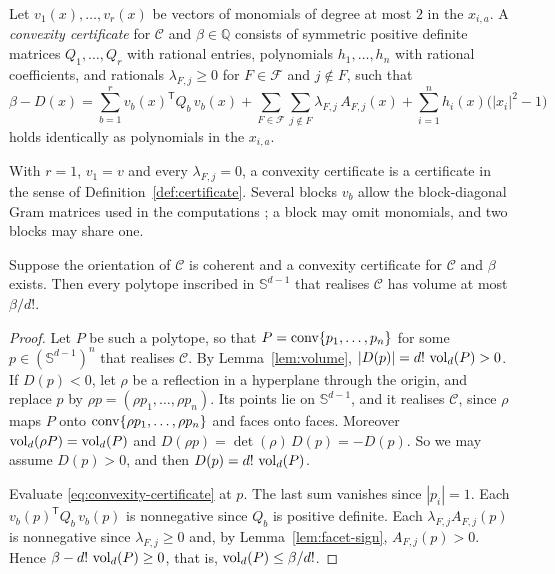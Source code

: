 \begin{definition}
  \label{def:convexity-certificate}
  Let $v_{1}(x), \ldots, v_{r}(x)$ be vectors of monomials of degree at most
  $2$ in the $x_{i,a}$. A \emph{convexity certificate} for $\mathcal{C}$ and
  $\beta \in \mathbb{Q}$ consists of symmetric positive definite matrices
  $Q_{1}, \ldots, Q_{r}$ with rational entries, polynomials
  $h_{1}, \ldots, h_{n}$ with rational coefficients, and rationals
  $\lambda_{F,j} \geq 0$ for $F \in \mathcal{F}$ and $j \notin F$, such that
  \begin{equation}
    \label{eq:convexity-certificate}
    \beta - D(x)
    = \sum_{b=1}^{r} v_{b}(x)^{\mathsf{T}} Q_{b}\, v_{b}(x)
      + \sum_{F \in \mathcal{F}} \sum_{j \notin F} \lambda_{F,j}\, A_{F,j}(x)
      + \sum_{i=1}^{n} h_{i}(x)\bigl(|x_{i}|^{2} - 1\bigr)
  \end{equation}
  holds identically as polynomials in the $x_{i,a}$.
\end{definition}

With $r = 1$, $v_{1} = v$ and every $\lambda_{F,j} = 0$, a convexity
certificate is a certificate in the sense of Definition~\ref{def:certificate}.
Several blocks $v_{b}$ allow the block-diagonal Gram matrices used in the
computations \cite[Section~3.4]{medgyes-maxvol-d4}; a block may omit
monomials, and two blocks may share one.

\begin{proposition}
  \label{prop:convexity-certificate}
  Suppose the orientation of $\mathcal{C}$ is coherent and a convexity
  certificate for $\mathcal{C}$ and $\beta$ exists. Then every polytope
  inscribed in $\mathbb{S}^{d-1}$ that realises $\mathcal{C}$ has volume at
  most $\beta/d!$.
\end{proposition}

\begin{proof}
  Let $P$ be such a polytope, so that $P = \operatorname{conv}\{p_{1}, \ldots, p_{n}\}$
  for some $p \in (\mathbb{S}^{d-1})^{n}$ that realises $\mathcal{C}$. By
  Lemma~\ref{lem:volume}, $|D(p)| = d!\,\operatorname{vol}_{d}(P) > 0$. If $D(p) < 0$,
  let $\rho$ be a reflection in a hyperplane through the origin, and
  replace $p$ by $\rho p = (\rho p_{1}, \ldots, \rho p_{n})$. Its points
  lie on $\mathbb{S}^{d-1}$, and it realises $\mathcal{C}$, since $\rho$
  maps $P$ onto $\operatorname{conv}\{\rho p_{1}, \ldots, \rho p_{n}\}$ and faces onto
  faces. Moreover $\operatorname{vol}_{d}(\rho P) = \operatorname{vol}_{d}(P)$ and
  $D(\rho p) = \det(\rho)\,D(p) = -D(p)$. So we may assume $D(p) > 0$,
  and then $D(p) = d!\,\operatorname{vol}_{d}(P)$.

  Evaluate \eqref{eq:convexity-certificate} at $p$. The last sum vanishes
  since $|p_{i}| = 1$. Each $v_{b}(p)^{\mathsf{T}} Q_{b}\, v_{b}(p)$ is
  nonnegative since $Q_{b}$ is positive definite. Each
  $\lambda_{F,j} A_{F,j}(p)$ is nonnegative since $\lambda_{F,j} \geq 0$ and,
  by Lemma~\ref{lem:facet-sign}, $A_{F,j}(p) > 0$. Hence
  $\beta - d!\,\operatorname{vol}_{d}(P) \geq 0$, that is,
  $\operatorname{vol}_{d}(P) \leq \beta/d!$.
\end{proof}

